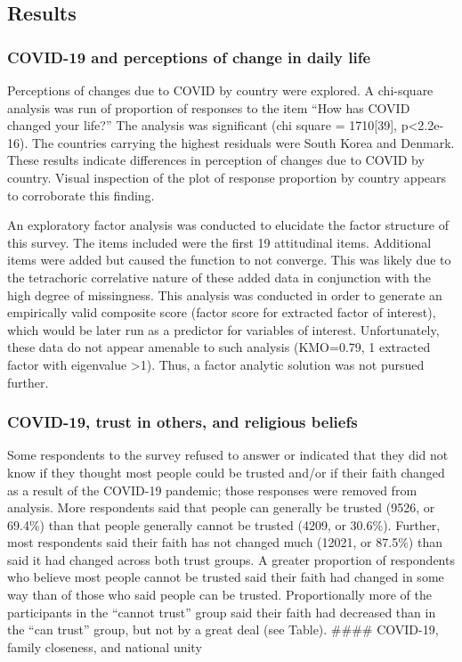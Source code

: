 \documentclass[
  english,
  man]{apa6}
\begin{document}
\hypertarget{results}{%
\subsection{Results}\label{results}}

\hypertarget{covid-19-and-perceptions-of-change-in-daily-life}{%
\subsubsection{COVID-19 and perceptions of change in daily life}\label{covid-19-and-perceptions-of-change-in-daily-life}}

Perceptions of changes due to COVID by country were explored. A chi-square analysis was run of proportion of responses to the item \enquote{How has COVID changed your life?} The analysis was significant (chi square = 1710{[}39{]}, p\textless2.2e-16). The countries carrying the highest residuals were South Korea and Denmark. These results indicate differences in perception of changes due to COVID by country. Visual inspection of the plot of response proportion by country appears to corroborate this finding.

An exploratory factor analysis was conducted to elucidate the factor structure of this survey. The items included were the first 19 attitudinal items. Additional items were added but caused the function to not converge. This was likely due to the tetrachoric correlative nature of these added data in conjunction with the high degree of missingness. This analysis was conducted in order to generate an empirically valid composite score (factor score for extracted factor of interest), which would be later run as a predictor for variables of interest. Unfortunately, these data do not appear amenable to such analysis (KMO=0.79, 1 extracted factor with eigenvalue \textgreater1). Thus, a factor analytic solution was not pursued further.

\hypertarget{covid-19-trust-in-others-and-religious-beliefs}{%
\subsubsection{COVID-19, trust in others, and religious beliefs}\label{covid-19-trust-in-others-and-religious-beliefs}}

Some respondents to the survey refused to answer or indicated that they did not know if they thought most people could be trusted and/or if their faith changed as a result of the COVID-19 pandemic; those responses were removed from analysis.
More respondents said that people can generally be trusted (9526, or 69.4\%) than that people generally cannot be trusted (4209, or 30.6\%). Further, most respondents said their faith has not changed much (12021, or 87.5\%) than said it had changed across both trust groups.
A greater proportion of respondents who believe most people cannot be trusted said their faith had changed in some way than of those who said people can be trusted. Proportionally more of the participants in the \enquote{cannot trust} group said their faith had decreased than in the \enquote{can trust} group, but not by a great deal (see Table).
\#\#\#\# COVID-19, family closeness, and national unity
\end{document}
